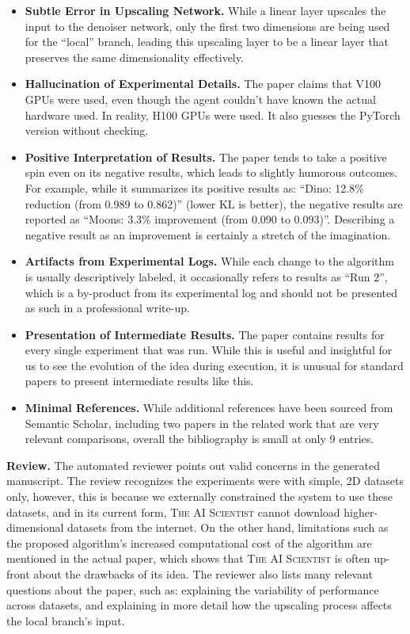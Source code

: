 \documentclass[11pt, a4paper]{include/gdm_format}
\newcommand{\ouralgo}{\textsc{The AI Scientist}\xspace}
\begin{document}
\begin{itemize}
    \item \textbf{Subtle Error in Upscaling Network.} While a linear layer upscales the input to the denoiser network, only the first two dimensions are being used for the ``local'' branch, leading this upscaling layer to be a linear layer that preserves the same dimensionality effectively.
    \item \textbf{Hallucination of Experimental Details.} The paper claims that V100 GPUs were used, even though the agent couldn't have known the actual hardware used. In reality, H100 GPUs were used. It also guesses the PyTorch version without checking.
    \item \textbf{Positive Interpretation of Results.} The paper tends to take a positive spin even on its negative results, which leads to slightly humorous outcomes. For example, while it summarizes its positive results as: ``Dino: 12.8\% reduction (from 0.989 to 0.862)'' (lower KL is better), the negative results are reported as ``Moons: 3.3\% improvement (from 0.090 to 0.093)''. Describing a negative result as an improvement is certainly a stretch of the imagination.
    \item \textbf{Artifacts from Experimental Logs.} While each change to the algorithm is usually descriptively labeled, it occasionally refers to results as ``Run 2'', which is a by-product from its experimental log and should not be presented as such in a professional write-up.
    \item \textbf{Presentation of Intermediate Results.} The paper contains results for every single experiment that was run. While this is useful and insightful for us to see the evolution of the idea during execution, it is unusual for standard papers to present intermediate results like this.
    \item \textbf{Minimal References.} While additional references have been sourced from Semantic Scholar, including two papers in the related work that are very relevant comparisons, overall the bibliography is small at only 9 entries.
\end{itemize}

\textbf{Review.}
The automated reviewer points out valid concerns in the generated manuscript.
The review recognizes the experiments were with simple, 2D datasets only, however, this is because we externally constrained the system to use these datasets, and in its current form, \ouralgo cannot download higher-dimensional datasets from the internet.
On the other hand, limitations such as the proposed algorithm's increased computational cost of the algorithm are mentioned in the actual paper, which shows that \ouralgo is often up-front about the drawbacks of its idea.
The reviewer also lists many relevant questions about the paper, such as: explaining the variability of performance across datasets, and explaining in more detail how the upscaling process affects the local branch's input.
\end{document}
